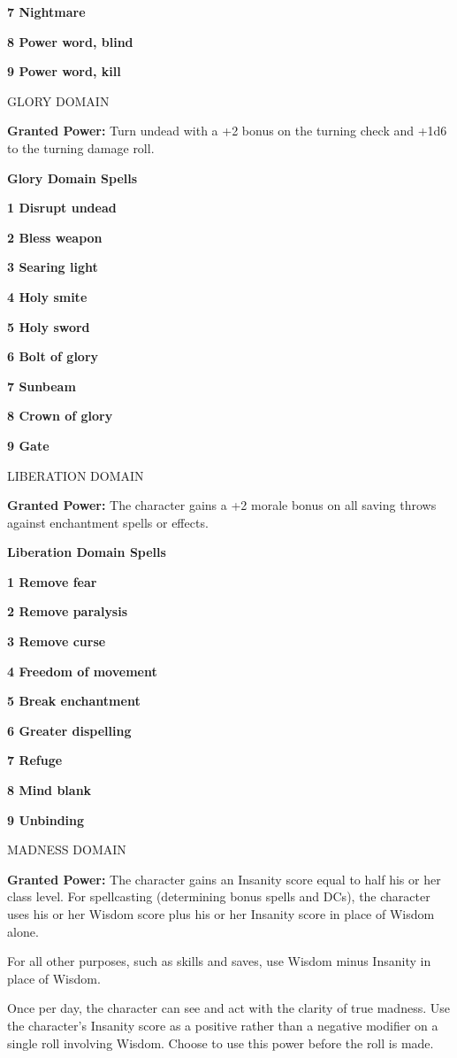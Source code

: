 \documentclass{article}
\begin{document}
\textbf{7 Nightmare}

\textbf{8 Power word, blind}

\textbf{9 Power word, kill}

\vspace{12pt}
GLORY DOMAIN

\textbf{Granted Power:} Turn undead with a +2 bonus on the turning check and +1d6 
to the turning damage roll.

\textbf{Glory Domain Spells}

\textbf{1 Disrupt undead}

\textbf{2 Bless weapon}

\textbf{3 Searing light}

\textbf{4 Holy smite}

\textbf{5 Holy sword}

\textbf{6 Bolt of glory}

\textbf{7 Sunbeam}

\textbf{8 Crown of glory}

\textbf{9 Gate}

\vspace{12pt}
LIBERATION DOMAIN

\textbf{Granted Power:} The character gains a +2 morale bonus on all saving throws 
against enchantment spells or effects.

\textbf{Liberation Domain Spells}

\textbf{1 Remove fear}

\textbf{2 Remove paralysis}

\textbf{3 Remove curse}

\textbf{4 Freedom of movement}

\textbf{5 Break enchantment}

\textbf{6 Greater dispelling}

\textbf{7 Refuge}

\textbf{8 Mind blank}

\textbf{9 Unbinding}

\vspace{12pt}
MADNESS DOMAIN

\textbf{Granted Power:} The character gains an Insanity score equal to half his 
or her class level. For spellcasting (determining bonus spells and DCs), the character 
uses his or her Wisdom score plus his or her Insanity score in place of Wisdom 
alone.

For all other purposes, such as skills and saves, use Wisdom minus Insanity in 
place of Wisdom. 

Once per day, the character can see and act with the clarity of true madness. Use 
the character's Insanity score as a positive rather than a negative modifier on 
a single roll involving Wisdom. Choose to use this power before the roll is made.
\end{document}
